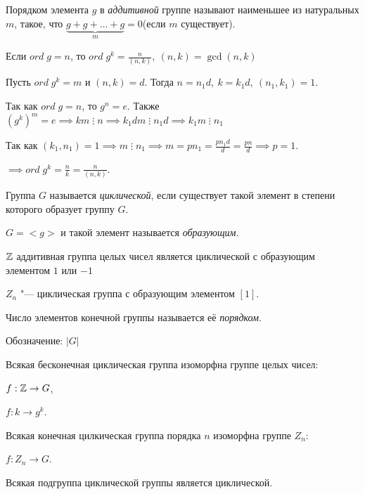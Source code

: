 Порядком элемента $g$ в \textit{аддитивной} группе называют наименьшее из натуральных $m$, такое, что $\underbrace{g+g+\ldots+g}_m = 0$(если $m$ существует).
\begin{theorem}
  Если $ord\;g = n$, то $ord\;g^k = \frac{n}{(n,k)},~(n,k) = \gcd(n,k)$
\end{theorem}
\begin{Proof}
  Пусть $ord\;g^k = m$ и $(n,k) = d$. Тогда $n = n_1d,~ k = k_1d, ~(n_1,k_1) =1$.

  Так как $ord\;g = n$, то $g^n = e$. Также $(g^k)^m = e \implies km\;\vdots\;n \implies k_1dm\;\vdots \; n_1d \implies k_1m \;\vdots\; n_1$
  
  Так как $(k_1,n_1) = 1 \implies m\;\vdots\;n_1 \implies m = pn_1 = \frac{pn_1d}{d} = \frac{pn}{d} \implies p = 1$.

  $\implies ord\;g^k = \frac{n}{k} = \frac{n}{(n,k)}$.
\end{Proof}

\begin{definition}
  Группа $G$ называется \textit{циклической}, если существует такой элемент в степени которого образует группу $G$. 
  
  $G = <\!g\!>$ и такой элемент называется \textit{образующим}.
\end{definition}

\begin{example}
  $\mathbb{Z}$ аддитивная группа целых чисел является циклической с образующим элементом $1$ или $-1$

  $Z_n$ "--- циклическая группа с образующим элементом $[1]$.
\end{example}

\begin{definition}
  Число элементов конечной группы называется её \textit{порядком}.

  Обозначение: $\mathopen|G\mathclose|$
\end{definition}
\begin{example}
  Всякая бесконечная циклическая группа изоморфна группе целых чисел:

  $f: \mathbb{Z} \to G$,

  $f: k \to g^k$.

  Всякая конечная цилкическая группа порядка $n$ изоморфна группе $Z_n$:

  $f: Z_n \to G$.

  
\end{example}
Всякая подгруппа циклической группы является циклической. 

